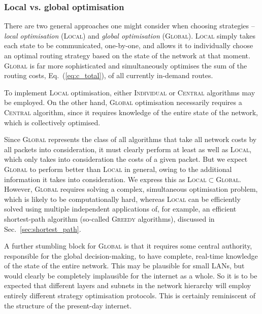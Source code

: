%
%

\subsubsection{Local vs. global optimisation} 

There are two general approaches one might consider when choosing strategies -- \textit{local optimisation} (\textsc{Local}) and \textit{global optimisation} (\textsc{Global}). \textsc{Local} simply takes each state to be communicated, one-by-one, and allows it to individually choose an optimal routing strategy based on the state of the network at that moment. \textsc{Global} is far more sophisticated and simultaneously optimises the sum of the routing costs, Eq.~(\ref{eq:c_total}), of all currently in-demand routes.

To implement \textsc{Local} optimisation, either \textsc{Individual} or \textsc{Central} algorithms may be employed. On the other hand, \textsc{Global} optimisation necessarily requires a \textsc{Central} algorithm, since it requires knowledge of the entire state of the network, which is collectively optimised.

Since \textsc{Global} represents the class of all algorithms that take all network costs by all packets into consideration, it must clearly perform at least as well as \textsc{Local}, which only takes into consideration the costs of a given packet. But we expect \textsc{Global} to perform better than \textsc{Local} in general, owing to the additional information it takes into consideration. We express this as \mbox{\textsc{Local}$\subset$\textsc{Global}}. However, \textsc{Global} requires solving a complex, simultaneous optimisation problem, which is likely to be computationally hard, whereas \textsc{Local} can be efficiently solved using multiple independent applications of, for example, an efficient shortest-path algorithm (so-called \textsc{Greedy} algorithms), discussed in Sec.~\ref{sec:shortest_path}.

A further stumbling block for \textsc{Global} is that it requires some central authority, responsible for the global decision-making, to have complete, real-time knowledge of the state of the entire network. This may be plausible for small LANs, but would clearly be completely implausible for the internet as a whole. So it is to be expected that different layers and subnets in the network hierarchy will employ entirely different strategy optimisation protocols. This is certainly reminiscent of the structure of the present-day internet.

